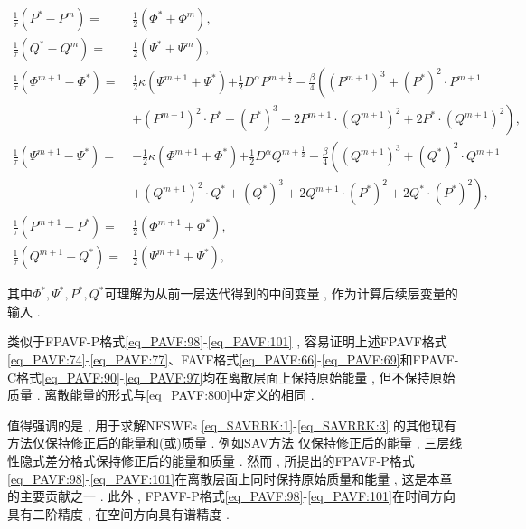 \begin{enumerate}[$\bullet$]
\begin{align}
\frac{1}{\tau}\left(P^{*}-P^{m}\right)=&\frac{1}{2}(\varPhi^{*}+\varPhi^{m}) , \label{eq_PAVF:92}\\
\frac{1}{\tau}\left(Q^{*}-Q^{m}\right)=&\frac{1}{2}(\Psi^{*}+\Psi^{m}) , \label{eq_PAVF:93}\\
\frac{1}{\tau}\left(\varPhi^{m+1}-\varPhi^{*}\right)=&\frac{1}{2}\kappa (\Psi^{m+1}+\Psi^{*}){+\frac{1}{2}D^{\alpha} P^{m+\frac{1}{2}}}-\frac{\beta}{4}\left((P^{m+1})^3+(P^{*})^{2}\cdot P^{m+1}\right . \nonumber\\
		&\left . +(P^{m+1})^{2}\cdot P^{*}+ (P^{*})^{3}+2 P^{m+1}\cdot (Q^{m+1})^{2}+2 P^{*}\cdot (Q^{m+1})^{2}\right) , \label{eq_PAVF:94}\\
\frac{1}{\tau}\left(\Psi^{m+1}-\Psi^{*}\right)=&-\frac{1}{2}\kappa (\varPhi^{m+1}+\varPhi^{*}){+\frac{1}{2}D^{\alpha} Q^{m+\frac{1}{2}}}-\frac{\beta}{4}\left((Q^{m+1})^3+(Q^{*})^{2}\cdot Q^{m+1}\right . \nonumber\\
		&\left . +(Q^{m+1})^{2}\cdot Q^{*}+ (Q^{*})^{3}+2 Q^{m+1}\cdot (P^{*})^{2}+2 Q^{*}\cdot (P^{*})^{2}\right) , \label{eq_PAVF:95}\\
\frac{1}{\tau}\left(P^{m+1}-P^{*}\right)=&\frac{1}{2}(\varPhi^{m+1}+\varPhi^{*}) , \label{eq_PAVF:96}\\
\frac{1}{\tau}\left(Q^{m+1}-Q^{*}\right)=&\frac{1}{2}(\Psi^{m+1}+\Psi^{*}) , \label{eq_PAVF:97}
\end{align}
\end{enumerate}
其中$\Phi^* , \Psi^* , P^* , Q^*$可理解为从前一层迭代得到的中间变量 , 作为计算后续层变量的输入 . 

\begin{remark}\label{rk_PAVF:1}
类似于FPAVF-P格式\eqref{eq_PAVF:98}-\eqref{eq_PAVF:101} , 容易证明上述FPAVF格式\eqref{eq_PAVF:74}-\eqref{eq_PAVF:77}、FAVF格式\eqref{eq_PAVF:66}-\eqref{eq_PAVF:69}和FPAVF-C格式\eqref{eq_PAVF:90}-\eqref{eq_PAVF:97}均在离散层面上保持原始能量 , 但不保持原始质量 . 离散能量的形式与\eqref{eq_PAVF:800}中定义的相同 . 
\end{remark}

\begin{remark}\label{rk_PAVF:2}
值得强调的是 , 用于求解NFSWEs \eqref{eq_SAVRRK:1}-\eqref{eq_SAVRRK:3} 的其他现有方法仅保持修正后的能量和(或)质量 . 
例如SAV方法 \cite{chengConvergenceEnergyconservingScheme2022}仅保持修正后的能量 , 
三层线性隐式差分格式\cite{ranLinearlyImplicitConservative2016}保持修正后的能量和质量 . 
然而 , 所提出的FPAVF-P格式\eqref{eq_PAVF:98}-\eqref{eq_PAVF:101}在离散层面上同时保持原始质量和能量 , 这是本章的主要贡献之一 . 
此外 , FPAVF-P格式\eqref{eq_PAVF:98}-\eqref{eq_PAVF:101}在时间方向具有二阶精度 , 在空间方向具有谱精度 . 
\end{remark}


